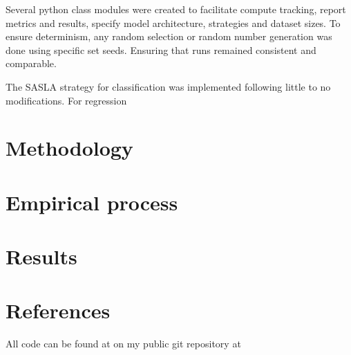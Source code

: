 \documentclass[conference]{IEEEtran}
\begin{document}
Several python class modules were created to facilitate compute tracking, report metrics and results, specify model architecture, strategies and dataset sizes. To ensure determinism, any random selection or random number generation was done using specific set seeds. Ensuring that runs remained consistent and comparable. 

The SASLA strategy for classification was implemented following %
little to no modifications. For regression
\section*{Methodology}
% 

\section*{Empirical process}

\section*{Results}
% 

\section*{References}
All code can be found at on my public git repository at 
\end{document}
